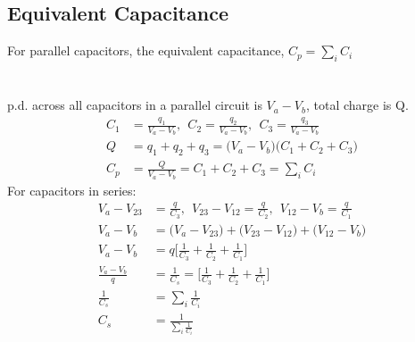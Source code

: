 \documentclass[a4paper, 11pt, normalem]{report}
\begin{document}
\section{Equivalent Capacitance}
For parallel capacitors, the equivalent capacitance, $C_{p} = \sum_{i} C_{i}$

\chapter{}
p.d. across all capacitors in a parallel circuit is $V_{a} - V_{b}$, total charge is Q.
\begin{align}
    C_{1} &= \frac{q_{1}}{V_{a} - V_{b}}, ~~ C_{2} = \frac{q_{2}}{V_{a} - V_{b}}, ~~ C_{3} = \frac{q_{3}}{V_{a} - V_{b}} \\
    Q &= q_{1} + q_{2} + q_{3} = \big(V_{a} - V_{b} \big) \big(C_{1} + C_{2} + C_{3} \big) \\
    C_{p} &= \frac{Q}{V_{a} - V_{b}} = C_{1} + C_{2} + C_{3} = \sum_{i} C_{i}
\end{align}
For capacitors in series:
\begin{align}
    V_{a} - V_{23} &= \frac{q}{C_{3}}, ~~ V_{23} - V_{12} = \frac{q}{C_{2}}, ~~ V_{12} - V_{b} = \frac{q}{C_{1}} \\
    V_{a} - V_{b} &= \big(V_{a} - V_{23} \big) + \big(V_{23} - V_{12} \big) + \big(V_{12} - V_{b}\big) \\
    V_{a} - V_{b} &= q \Big[\frac{1}{C_{3}} + \frac{1}{C_{2}} + \frac{1}{C_{1}} \Big] \\
    \frac{V_{a} - V_{b}}{q} &= \frac{1}{C_{s}} = \Big[\frac{1}{C_{3}} + \frac{1}{C_{2}} + \frac{1}{C_{1}} \Big] \\
    \frac{1}{C_{s}} &= \sum_{i} \frac{1}{C_{i}} \\
    C_{s} &= \frac{1}{\sum_{i} \tfrac{1}{C_{i}}}
\end{align}
\end{document}
